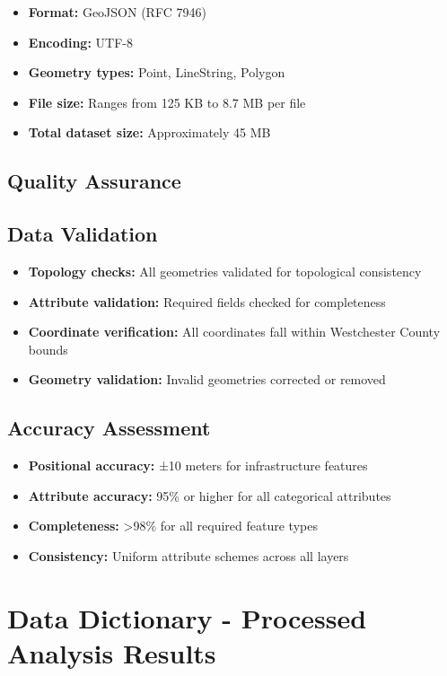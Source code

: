 \documentclass[11pt,letterpaper]{article}
\begin{document}
\begin{itemize}
    \item \textbf{Format:} GeoJSON (RFC 7946)
    \item \textbf{Encoding:} UTF-8
    \item \textbf{Geometry types:} Point, LineString, Polygon
    \item \textbf{File size:} Ranges from 125 KB to 8.7 MB per file
    \item \textbf{Total dataset size:} Approximately 45 MB
\end{itemize}

\subsection{Quality Assurance}

\subsection{Data Validation}
\begin{itemize}
    \item \textbf{Topology checks:} All geometries validated for topological consistency
    \item \textbf{Attribute validation:} Required fields checked for completeness
    \item \textbf{Coordinate verification:} All coordinates fall within Westchester County bounds
    \item \textbf{Geometry validation:} Invalid geometries corrected or removed
\end{itemize}

\subsection{Accuracy Assessment}
\begin{itemize}
    \item \textbf{Positional accuracy:} ±10 meters for infrastructure features
    \item \textbf{Attribute accuracy:} 95\% or higher for all categorical attributes
    \item \textbf{Completeness:} >98\% for all required feature types
    \item \textbf{Consistency:} Uniform attribute schemes across all layers
\end{itemize}

\section{Data Dictionary - Processed Analysis Results}
\end{document}
